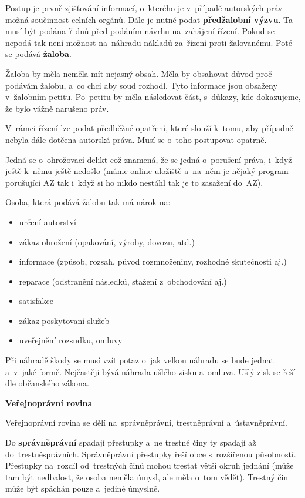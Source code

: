 Postup je prvně zjišťování informací, o~kterého je v~případě autorských práv možná součinnost celních orgánů. Dále je nutné podat \textbf{předžalobní výzvu}. Ta musí být podána 7 dnů před podáním návrhu na~zahájení řízení. Pokud se nepodá tak není možnost na~náhradu nákladů za~řízení proti žalovanému. Poté se podává \textbf{žaloba}.

Žaloba by měla neměla mít nejasný obsah. Měla by obsahovat důvod proč podávám žalobu, a~co chci aby soud rozhodl. Tyto informace jsou obsaženy v~žalobním petitu. Po~petitu by měla následovat část, s~důkazy, kde dokazujeme, že bylo vážně narušeno práv.

V~rámci řízení lze podat předběžné opatření, které slouží k~tomu, aby případně nebyla dále dotčena autorská práva. Musí se o~toho postupovat opatrně.

Jedná se o~ohrožovací delikt což znamená, že se jedná o~porušení práva, i~když ještě k~němu ještě nedošlo (máme online uložiště a~na~něm je nějaký program porušující AZ tak i~když si ho nikdo nestáhl tak je to zasažení do~AZ).

Osoba, která podává žalobu tak má nárok na:
\begin{itemize} 
	\item určení autorství
	\item zákaz ohrožení (opakování, výroby, dovozu, atd.)
	\item informace (způsob, rozsah, původ rozmnoženiny, rozhodné skutečnosti aj.)
	\item reparace (odstranění následků, stažení z~obchodování aj.)
	\item satisfakce
	\item zákaz poskytovaní služeb
	\item uveřejnění rozsudku, omluvy
\end{itemize}

Při náhradě škody se musí vzít potaz o~jak velkou náhradu se bude jednat a~v~jaké formě. Nejčastěji bývá náhrada ušlého zisku a~omluva. Ušlý zisk se řeší dle občanského zákona.


\vspace{0,5cm}
\begin{Large}
\textbf{Veřejnoprávní rovina}
\end{Large}

Veřejnoprávní rovina se dělí na~správněprávní, trestněprávní a~ústavněprávní.

Do \textbf{správněprávní} spadají přestupky a~ne trestné činy ty spadají až do~trestněsprávních. Správněprávní přestupky řeší obce s~rozšířenou působností. Přestupky na~rozdíl od~trestných činů mohou trestat větší okruh jednání (může tam být nedbalost, že osoba neměla úmysl, ale měla o~tom vědět). Trestný čin může být spáchán pouze a~jedině úmyslně.

